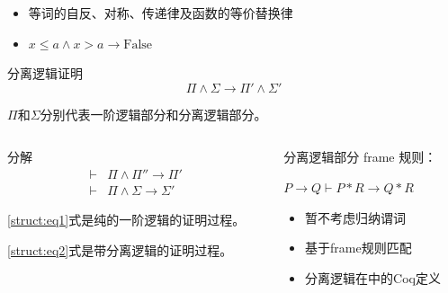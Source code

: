 \documentclass{beamer}
\begin{document}
\begin{frame}[fragile]
\begin{columns}
    \end{columns}

  \begin{block}{}
    \begin{itemize}
    \item 等词的自反、对称、传递律及函数的等价替换律
    \item $x \leq a \land x > a \rightarrow \mathrm{False}$
    \end{itemize}
  \end{block}
\end{frame}

\begin{frame}[fragile]
  \begin{block}{分离逻辑证明}
    $$ \Pi \land \Sigma \rightarrow \Pi' \land \Sigma' $$
    
    $\Pi$和$\Sigma$分别代表一阶逻辑部分和分离逻辑部分。
  \end{block}
  \begin{columns}
    \begin{column}{0.5\textwidth}
      \begin{block}{分解}
        \begin{eqnarray}
          \vdash & \Pi \land \Pi'' \rightarrow \Pi' \label{struct:eq1}\\
          \vdash & \Pi \land \Sigma \rightarrow \Sigma' \label{struct:eq2}
        \end{eqnarray}

        \ref{struct:eq1}式是纯的一阶逻辑的证明过程。

        \ref{struct:eq2}式是带分离逻辑的证明过程。
      \end{block}
    \end{column}
    \begin{column}{0.5\textwidth}
      \begin{block}{分离逻辑部分}
        frame 规则：
        \begin{center}
        $ P \rightarrow Q \vdash P \ast R \rightarrow Q \ast R$
        \end{center}
        \begin{itemize}
        \item 暂不考虑归纳谓词
        \item 基于frame规则匹配
        \item 分离逻辑在中的Coq定义
        \end{itemize}
      \end{block}
    \end{column}
\end{columns}
\end{frame}
\end{document}

